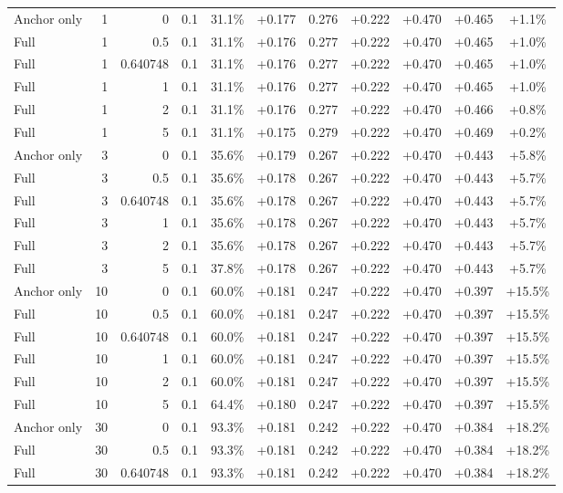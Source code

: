 \begin{table}[htbp]
\begin{tabular}{lrrrccccccc}
Anchor only & 1 & 0 & 0.1 & 31.1\% & +0.177 & 0.276 & +0.222 & +0.470 & +0.465 & +1.1\% \\
Full & 1 & 0.5 & 0.1 & 31.1\% & +0.176 & 0.277 & +0.222 & +0.470 & +0.465 & +1.0\% \\
Full & 1 & 0.640748 & 0.1 & 31.1\% & +0.176 & 0.277 & +0.222 & +0.470 & +0.465 & +1.0\% \\
Full & 1 & 1 & 0.1 & 31.1\% & +0.176 & 0.277 & +0.222 & +0.470 & +0.465 & +1.0\% \\
Full & 1 & 2 & 0.1 & 31.1\% & +0.176 & 0.277 & +0.222 & +0.470 & +0.466 & +0.8\% \\
Full & 1 & 5 & 0.1 & 31.1\% & +0.175 & 0.279 & +0.222 & +0.470 & +0.469 & +0.2\% \\
Anchor only & 3 & 0 & 0.1 & 35.6\% & +0.179 & 0.267 & +0.222 & +0.470 & +0.443 & +5.8\% \\
Full & 3 & 0.5 & 0.1 & 35.6\% & +0.178 & 0.267 & +0.222 & +0.470 & +0.443 & +5.7\% \\
Full & 3 & 0.640748 & 0.1 & 35.6\% & +0.178 & 0.267 & +0.222 & +0.470 & +0.443 & +5.7\% \\
Full & 3 & 1 & 0.1 & 35.6\% & +0.178 & 0.267 & +0.222 & +0.470 & +0.443 & +5.7\% \\
Full & 3 & 2 & 0.1 & 35.6\% & +0.178 & 0.267 & +0.222 & +0.470 & +0.443 & +5.7\% \\
Full & 3 & 5 & 0.1 & 37.8\% & +0.178 & 0.267 & +0.222 & +0.470 & +0.443 & +5.7\% \\
Anchor only & 10 & 0 & 0.1 & 60.0\% & +0.181 & 0.247 & +0.222 & +0.470 & +0.397 & +15.5\% \\
Full & 10 & 0.5 & 0.1 & 60.0\% & +0.181 & 0.247 & +0.222 & +0.470 & +0.397 & +15.5\% \\
Full & 10 & 0.640748 & 0.1 & 60.0\% & +0.181 & 0.247 & +0.222 & +0.470 & +0.397 & +15.5\% \\
Full & 10 & 1 & 0.1 & 60.0\% & +0.181 & 0.247 & +0.222 & +0.470 & +0.397 & +15.5\% \\
Full & 10 & 2 & 0.1 & 60.0\% & +0.181 & 0.247 & +0.222 & +0.470 & +0.397 & +15.5\% \\
Full & 10 & 5 & 0.1 & 64.4\% & +0.180 & 0.247 & +0.222 & +0.470 & +0.397 & +15.5\% \\
Anchor only & 30 & 0 & 0.1 & 93.3\% & +0.181 & 0.242 & +0.222 & +0.470 & +0.384 & +18.2\% \\
Full & 30 & 0.5 & 0.1 & 93.3\% & +0.181 & 0.242 & +0.222 & +0.470 & +0.384 & +18.2\% \\
Full & 30 & 0.640748 & 0.1 & 93.3\% & +0.181 & 0.242 & +0.222 & +0.470 & +0.384 & +18.2\% \\

\end{tabular}
\end{table}
